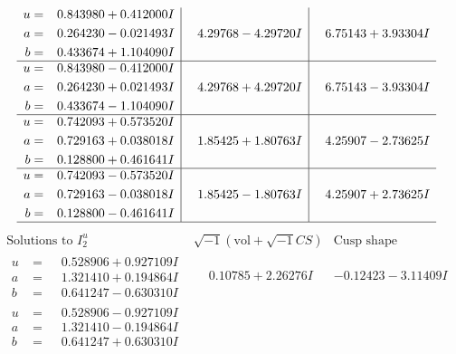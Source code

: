 \documentclass[1p]{elsarticle_modified}
\theoremstyle{definition}
\newcommand{\I}{\sqrt{-1}}
\begin{document}
$$\begin{array}{c|c|c}
\begin{aligned}
u &= \phantom{-}0.843980 + 0.412000 I \\
a &= \phantom{-}0.264230 - 0.021493 I \\
b &= \phantom{-}0.433674 + 1.104090 I\end{aligned}
 & \phantom{-}4.29768 - 4.29720 I & \phantom{-}6.75143 + 3.93304 I \\ \hline\begin{aligned}
u &= \phantom{-}0.843980 - 0.412000 I \\
a &= \phantom{-}0.264230 + 0.021493 I \\
b &= \phantom{-}0.433674 - 1.104090 I\end{aligned}
 & \phantom{-}4.29768 + 4.29720 I & \phantom{-}6.75143 - 3.93304 I \\ \hline\begin{aligned}
u &= \phantom{-}0.742093 + 0.573520 I \\
a &= \phantom{-}0.729163 + 0.038018 I \\
b &= \phantom{-}0.128800 + 0.461641 I\end{aligned}
 & \phantom{-}1.85425 + 1.80763 I & \phantom{-}4.25907 - 2.73625 I \\ \hline\begin{aligned}
u &= \phantom{-}0.742093 - 0.573520 I \\
a &= \phantom{-}0.729163 - 0.038018 I \\
b &= \phantom{-}0.128800 - 0.461641 I\end{aligned}
 & \phantom{-}1.85425 - 1.80763 I & \phantom{-}4.25907 + 2.73625 I\\
 \hline 
 \end{array}$$\newpage$$\begin{array}{c|c|c}  
\text{Solutions to }I^u_{2}& \I (\text{vol} + \sqrt{-1}CS) & \text{Cusp shape}\\
 \hline 
\begin{aligned}
u &= \phantom{-}0.528906 + 0.927109 I \\
a &= \phantom{-}1.321410 + 0.194864 I \\
b &= \phantom{-}0.641247 - 0.630310 I\end{aligned}
 & \phantom{-}0.10785 + 2.26276 I & -0.12423 - 3.11409 I \\ \hline\begin{aligned}
u &= \phantom{-}0.528906 - 0.927109 I \\
a &= \phantom{-}1.321410 - 0.194864 I \\
b &= \phantom{-}0.641247 + 0.630310 I\end{aligned}

\end{array}$$
\end{document}
